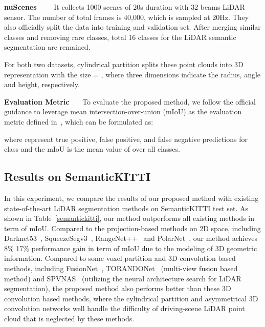 \documentclass[final]{cvpr}
\begin{document}
\vspace{0.5ex}
\noindent\textbf{nuScenes~\cite{nuscenes}}~~~ It collects 1000 scenes of 20s duration with 32 beams LiDAR sensor. The number of total frames is 40,000, which is sampled at 20Hz. They also officially split the data into training and validation set. After merging similar classes and removing rare classes, total 16 classes for the LiDAR semantic segmentation are remained. 

For both two datasets, cylindrical partition splits these point clouds into 3D representation with the size = , where three dimensions indicate the radius, angle and height, respectively.

\vspace{0.5ex}
\noindent\textbf{Evaluation Metric}~~~
To evaluate the proposed method, we follow the official guidance to leverage mean intersection-over-union (mIoU) as the evaluation metric defined in~\cite{behley2019semantickitti,nuscenes}, which can be formulated as:

where  represent true positive, false positive, and false negative predictions for
class  and the mIoU is the mean value of  over all classes.

\subsection{Results on SemanticKITTI}



In this experiment, we compare the results of our proposed method with existing state-of-the-art LiDAR segmentation methods on SemanticKITTI test set. As shown in Table~\ref{semantickitti}, our method outperforms all existing methods in term of mIoU. Compared to the projection-based methods on 2D space, including Darknet53~\cite{behley2019semantickitti}, SqueezeSegv3~\cite{xu2020squeezesegv3}, RangeNet++~\cite{milioto2019rangenet++} and PolarNet~\cite{zhang2020polarnet}, our method achieves 8\%  17\% performance gain in term of mIoU due to the modeling of 3D geometric information. Compared to some voxel partition and 3D convolution based methods, including FusionNet~\cite{zhang12356deep}, TORANDONet~\cite{gerdzhev2020tornado} (multi-view fusion based method) and SPVNAS~\cite{tang2020searching} (utilizing the neural architecture search for LiDAR segmentation), the proposed method also performs better than these 3D convolution based methods, where the cylindrical partition and asymmetrical 3D convolution networks well handle the difficulty of driving-scene LiDAR point cloud that is neglected by these methods.
\end{document}
